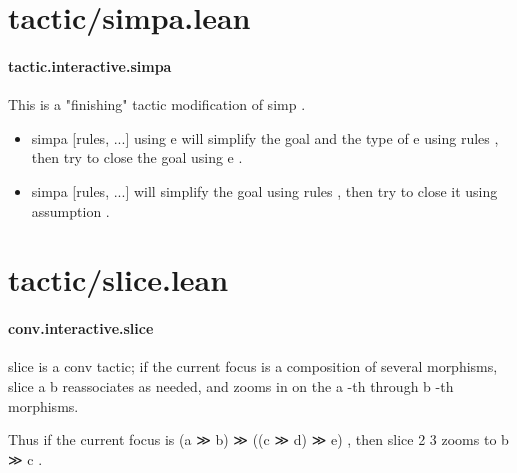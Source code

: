 \documentclass{article}
\begin{document}
\section{tactic/simpa.lean}\paragraph{tactic.interactive.simpa}
\par
This is a "finishing" tactic modification of 
\colorbox[RGB]{253,246,227}{{{{\color[RGB]{101, 123, 131} simp }}}}.
\begin{itemize}\item \par
\colorbox[RGB]{253,246,227}{{{{\color[RGB]{101, 123, 131} simpa {[}rules, ...{]}  }}}{{{\color[RGB]{133, 153, 0} using }}}{{{\color[RGB]{101, 123, 131}  e }}}} will simplify the goal and the type of
\colorbox[RGB]{253,246,227}{{{{\color[RGB]{101, 123, 131} e }}}} using 
\colorbox[RGB]{253,246,227}{{{{\color[RGB]{101, 123, 131} rules }}}}, then try to close the goal using 
\colorbox[RGB]{253,246,227}{{{{\color[RGB]{101, 123, 131} e }}}}.

\item \par
\colorbox[RGB]{253,246,227}{{{{\color[RGB]{101, 123, 131} simpa {[}rules, ...{]} }}}} will simplify the goal using 
\colorbox[RGB]{253,246,227}{{{{\color[RGB]{101, 123, 131} rules }}}}, then try
to close it using 
\colorbox[RGB]{253,246,227}{{{{\color[RGB]{101, 123, 131} assumption }}}}.

\end{itemize}\section{tactic/slice.lean}\paragraph{conv.interactive.slice}
\par
\colorbox[RGB]{253,246,227}{{{{\color[RGB]{101, 123, 131} slice }}}} is a conv tactic; if the current focus is a composition of several morphisms,
\colorbox[RGB]{253,246,227}{{{{\color[RGB]{101, 123, 131} slice a b }}}} reassociates as needed, and zooms in on the 
\colorbox[RGB]{253,246,227}{{{{\color[RGB]{101, 123, 131} a }}}}-th through 
\colorbox[RGB]{253,246,227}{{{{\color[RGB]{101, 123, 131} b }}}}-th morphisms.
\par
Thus if the current focus is 
\colorbox[RGB]{253,246,227}{{{{\color[RGB]{101, 123, 131} (a ≫ b) ≫ ((c ≫ d) ≫ e) }}}}, then 
\colorbox[RGB]{253,246,227}{{{{\color[RGB]{101, 123, 131} slice  }}}{{{\color[RGB]{108, 113, 196} 2 }}}{{{\color[RGB]{101, 123, 131}   }}}{{{\color[RGB]{108, 113, 196} 3 }}}} zooms to 
\colorbox[RGB]{253,246,227}{{{{\color[RGB]{101, 123, 131} b ≫ c }}}}.
\end{document}
